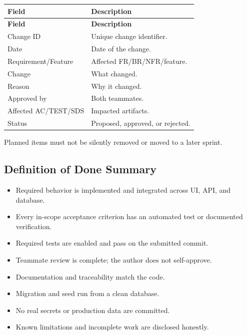 \documentclass[11pt,a4paper]{article}
\begin{document}
\vspace{0.3em}
\begin{longtable}{|>{\RaggedRight}p{4.5cm}|>{\RaggedRight}p{11.3cm}|}
\hline
\rowcolor{zenPale}\textbf{Field} & \textbf{Description} \\ \hline
\endfirsthead
\hline
\rowcolor{zenPale}\textbf{Field} & \textbf{Description} \\ \hline
\endhead
\hline
\endfoot
Change ID & Unique change identifier. \\ \hline
Date & Date of the change. \\ \hline
Requirement/Feature & Affected FR/BR/NFR/feature. \\ \hline
Change & What changed. \\ \hline
Reason & Why it changed. \\ \hline
Approved by & Both teammates. \\ \hline
Affected AC/TEST/SDS & Impacted artifacts. \\ \hline
Status & Proposed, approved, or rejected. \\ \hline
\end{longtable}
\vspace{0.3em}

Planned items must not be silently removed or moved to a later sprint.\\


\subsection{Definition of Done Summary}

\begin{itemize}[leftmargin=*,itemsep=2pt,topsep=2pt]
  \item Required behavior is implemented and integrated across UI, API, and database.
  \item Every in-scope acceptance criterion has an automated test or documented verification.
  \item Required tests are enabled and pass on the submitted commit.
  \item Teammate review is complete; the author does not self-approve.
  \item Documentation and traceability match the code.
  \item Migration and seed run from a clean database.
  \item No real secrets or production data are committed.
  \item Known limitations and incomplete work are disclosed honestly.
\end{itemize}
\end{document}
